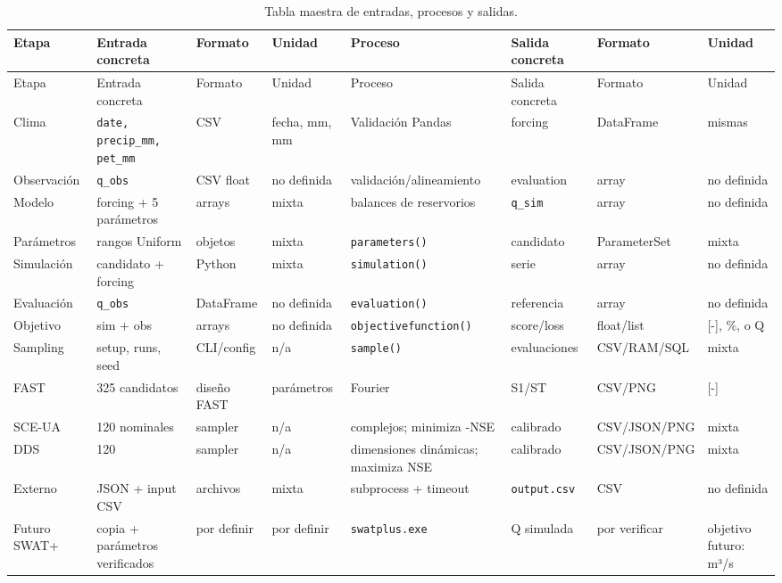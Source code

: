 \begin{landscape}
\scriptsize
\begin{longtable}{p{2.1cm}p{3.0cm}p{2.0cm}p{2.0cm}p{3.6cm}p{3.0cm}p{2.2cm}p{2.0cm}}
\caption{Tabla maestra de entradas, procesos y salidas.}\label{tab:masterio}\\
\toprule Etapa & Entrada concreta & Formato & Unidad & Proceso & Salida concreta & Formato & Unidad\\\midrule\endfirsthead
\toprule Etapa & Entrada concreta & Formato & Unidad & Proceso & Salida concreta & Formato & Unidad\\\midrule\endhead
Clima & \texttt{date, precip\_mm, pet\_mm} & CSV & fecha, mm, mm & Validación Pandas & forcing & DataFrame & mismas\\
Observación & \texttt{q\_obs} & CSV float & no definida & validación/alineamiento & evaluation & array & no definida\\
Modelo & forcing + 5 parámetros & arrays & mixta & balances de reservorios & \texttt{q\_sim} & array & no definida\\
Parámetros & rangos Uniform & objetos & mixta & \texttt{parameters()} & candidato & ParameterSet & mixta\\
Simulación & candidato + forcing & Python & mixta & \texttt{simulation()} & serie & array & no definida\\
Evaluación & \texttt{q\_obs} & DataFrame & no definida & \texttt{evaluation()} & referencia & array & no definida\\
Objetivo & sim + obs & arrays & no definida & \texttt{objectivefunction()} & score/loss & float/list & [-], \%, o Q\\
Sampling & setup, runs, seed & CLI/config & n/a & \texttt{sample()} & evaluaciones & CSV/RAM/SQL & mixta\\
FAST & 325 candidatos & diseño FAST & parámetros & Fourier & S1/ST & CSV/PNG & [-]\\
SCE-UA & 120 nominales & sampler & n/a & complejos; minimiza -NSE & calibrado & CSV/JSON/PNG & mixta\\
DDS & 120 & sampler & n/a & dimensiones dinámicas; maximiza NSE & calibrado & CSV/JSON/PNG & mixta\\
Externo & JSON + input CSV & archivos & mixta & subprocess + timeout & \texttt{output.csv} & CSV & no definida\\
Futuro SWAT+ & copia + parámetros verificados & por definir & por definir & \texttt{swatplus.exe} & Q simulada & por verificar & objetivo futuro: m³/s\\
\bottomrule
\end{longtable}
\end{landscape}

